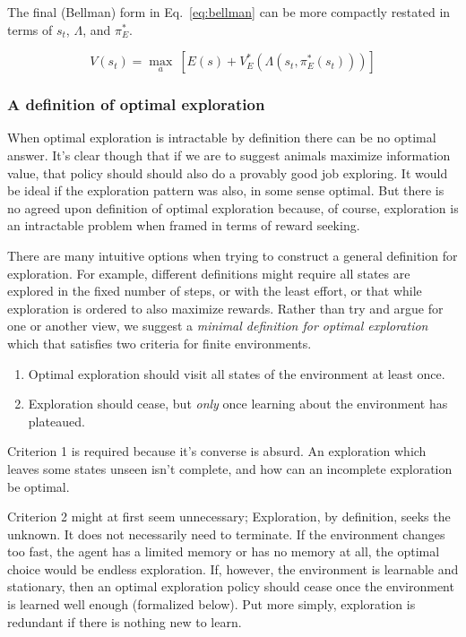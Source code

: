 \documentclass[9pt,twocolumn,twoside]{pnas-new}
\begin{document}
The final (Bellman) form in Eq.~\ref{eq:bellman} can be more compactly restated in terms of $s_t$, $\Lambda$, and $\pi^*_E$.

\begin{equation} \label{eq:e_policy}
    V(s_t) = \max_a\ [ E(s) + V^*_E(\Lambda(s_t, \pi^*_E(s_t)))]
\end{equation}
    

\subsubsection*{A definition of optimal exploration}
When optimal exploration is intractable by definition there can be no optimal answer. It's clear though that if we are to suggest animals maximize information value, that policy should should also do a provably good job exploring. It would be ideal if the exploration pattern was also, in some sense optimal. But there is no agreed upon definition of optimal exploration because, of course, exploration is an intractable problem when framed in terms of reward seeking.

There are many intuitive options when trying to construct a general definition for exploration. For example, different definitions might require all states are explored in the fixed number of steps, or with the least effort, or that while exploration is ordered to also maximize rewards. Rather than try and argue for one or another view, we suggest a \textit{minimal definition for optimal exploration} which that satisfies two criteria for finite environments. 

\begin{enumerate}[noitemsep,wide=0pt,leftmargin=\dimexpr\labelwidth+2\labelsep\relax]
    \item Optimal exploration should visit all states of the environment at least once. 
    \item Exploration should cease, but \textit{only} once learning about the environment has plateaued. 
\end{enumerate}

Criterion 1 is required because it's converse is absurd. An exploration which leaves some states unseen isn't complete, and how can an incomplete exploration be optimal.

Criterion 2 might at first seem unnecessary; Exploration, by definition, seeks the unknown. It does not necessarily need to terminate. If the environment changes too fast, the agent has a limited memory or has no memory at all, the optimal choice would be endless exploration. If, however, the environment is learnable and stationary, then an optimal exploration policy should cease once the environment is learned well enough (formalized below). Put more simply, exploration is redundant if there is nothing new to learn.
\end{document}
